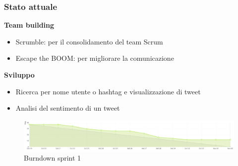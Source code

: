 \documentclass{beamer}
\begin{document}
\begin{frame}
  \frametitle{Stato attuale}
  \vspace*{1em}

  \textbf{Team building}
  \begin{itemize}
    \item Scrumble: per il consolidamento del team Scrum
    \item Escape the BOOM: per migliorare la comunicazione
  \end{itemize}
  
  \vspace*{2em}

  \textbf{Sviluppo}
  \begin{itemize}
    \item Ricerca per nome utente o hashtag e visualizzazione di tweet
    \item Analisi del sentimento di un tweet
  \end{itemize}
  \begin{figure}
    \centering
    \includegraphics[width=\textwidth]{./img/burndown.png}
    \caption{Burndown sprint 1}
  \end{figure}
\end{frame}
\end{document}
